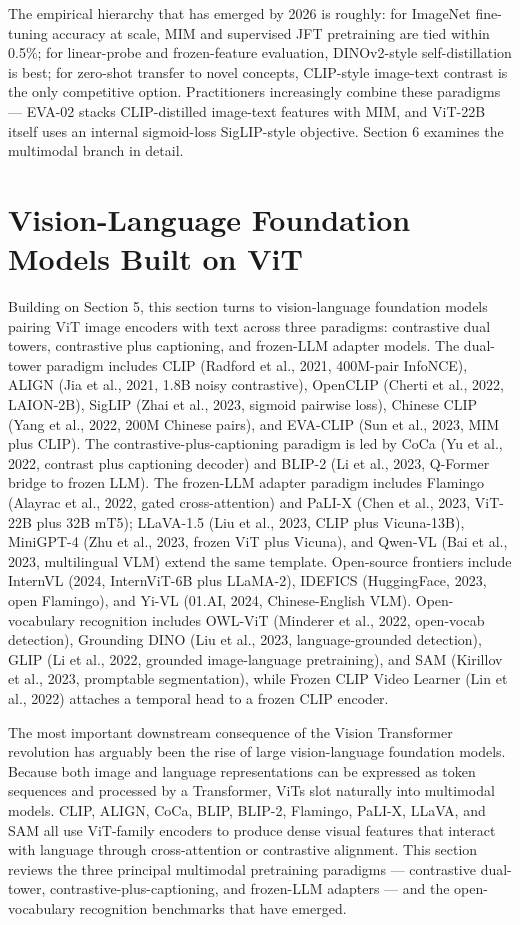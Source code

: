 \documentclass{article}
\begin{document}
The empirical hierarchy that has emerged by 2026 is roughly: for ImageNet fine-tuning accuracy at scale, MIM and supervised JFT pretraining are tied within 0.5\%; for linear-probe and frozen-feature evaluation, DINOv2-style self-distillation is best; for zero-shot transfer to novel concepts, CLIP-style image-text contrast is the only competitive option. Practitioners increasingly combine these paradigms --- EVA-02 stacks CLIP-distilled image-text features with MIM, and ViT-22B itself uses an internal sigmoid-loss SigLIP-style objective. Section 6 examines the multimodal branch in detail.

\section{Vision-Language Foundation Models Built on ViT}\label{vision-language-foundation-models-built-on-vit}

Building on Section 5, this section turns to vision-language foundation models pairing ViT image encoders with text across three paradigms: contrastive dual towers, contrastive plus captioning, and frozen-LLM adapter models. The dual-tower paradigm includes CLIP (Radford et al., 2021, 400M-pair InfoNCE), ALIGN (Jia et al., 2021, 1.8B noisy contrastive), OpenCLIP (Cherti et al., 2022, LAION-2B), SigLIP (Zhai et al., 2023, sigmoid pairwise loss), Chinese CLIP (Yang et al., 2022, 200M Chinese pairs), and EVA-CLIP (Sun et al., 2023, MIM plus CLIP). The contrastive-plus-captioning paradigm is led by CoCa (Yu et al., 2022, contrast plus captioning decoder) and BLIP-2 (Li et al., 2023, Q-Former bridge to frozen LLM). The frozen-LLM adapter paradigm includes Flamingo (Alayrac et al., 2022, gated cross-attention) and PaLI-X (Chen et al., 2023, ViT-22B plus 32B mT5); LLaVA-1.5 (Liu et al., 2023, CLIP plus Vicuna-13B), MiniGPT-4 (Zhu et al., 2023, frozen ViT plus Vicuna), and Qwen-VL (Bai et al., 2023, multilingual VLM) extend the same template. Open-source frontiers include InternVL (2024, InternViT-6B plus LLaMA-2), IDEFICS (HuggingFace, 2023, open Flamingo), and Yi-VL (01.AI, 2024, Chinese-English VLM). Open-vocabulary recognition includes OWL-ViT (Minderer et al., 2022, open-vocab detection), Grounding DINO (Liu et al., 2023, language-grounded detection), GLIP (Li et al., 2022, grounded image-language pretraining), and SAM (Kirillov et al., 2023, promptable segmentation), while Frozen CLIP Video Learner (Lin et al., 2022) attaches a temporal head to a frozen CLIP encoder.

The most important downstream consequence of the Vision Transformer revolution has arguably been the rise of large vision-language foundation models. Because both image and language representations can be expressed as token sequences and processed by a Transformer, ViTs slot naturally into multimodal models. CLIP, ALIGN, CoCa, BLIP, BLIP-2, Flamingo, PaLI-X, LLaVA, and SAM all use ViT-family encoders to produce dense visual features that interact with language through cross-attention or contrastive alignment. This section reviews the three principal multimodal pretraining paradigms --- contrastive dual-tower, contrastive-plus-captioning, and frozen-LLM adapters --- and the open-vocabulary recognition benchmarks that have emerged.
\end{document}
